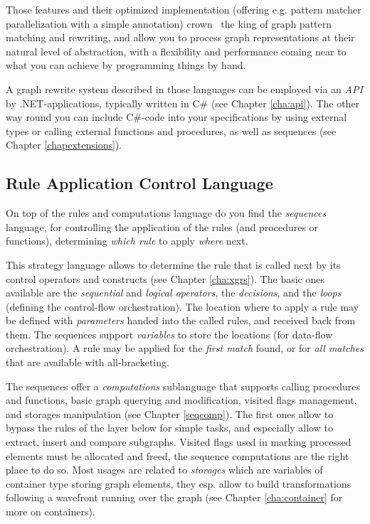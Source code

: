 Those features and their optimized implementation (offering e.g. pattern matcher parallelization with a simple annotation) crown \GrG\ the king of graph pattern matching and rewriting, and allow you to process graph representations at their natural level of abstraction, with a flexibility and performance coming near to what you can achieve by programming things by hand.

A graph rewrite system described in those languages can be employed via an \emph{API} by .NET-applications, typically written in C\# (see Chapter \ref{cha:api}).
The other way round you can include C\#-code into your specifications by using external types or calling external functions and procedures, as well as sequences (see Chapter \ref{chapextensions}).

\subsection{Rule Application Control Language}
On top of the rules and computations language do you find the \emph{sequences} language, for controlling the application of the rules (and procedures or functions), determining \emph{which rule} to apply \emph{where} next. 

This strategy language allows to determine the rule that is called next by its control operators and constructs (see Chapter \ref{cha:xgrs}).
The basic ones available are the \emph{sequential} and \emph{logical operators}, the \emph{decisions}, and the \emph{loops} (defining the control-flow orchestration).
The location where to apply a rule may be defined with \emph{parameters} handed into the called rules, and received back from them. 
The sequences support \emph{variables} to store the locations (for data-flow orchestration).
A rule may be applied for the \emph{first match} found, or for \emph{all matches} that are available with all-bracketing.

The sequences offer a \emph{computations} sublanguage that supports calling procedures and functions, basic graph querying and modification, visited flags management, and storages manipulation (see Chapter \ref{seqcomp}).
The first ones allow to bypass the rules of the layer below for simple tasks, and especially allow to extract, insert and compare subgraphs. 
Visited flags used in marking processed elements must be allocated and freed, the sequence computations are the right place to do so.
Most usages are related to \emph{storages} which are variables of container type storing graph elements, they esp. allow to build transformations following a wavefront running over the graph (see Chapter \ref{cha:container} for more on containers).

